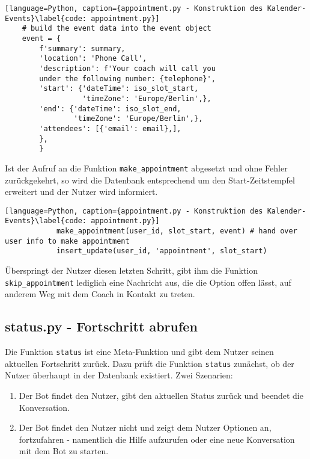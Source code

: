            \begin{lstlisting}[language=Python, caption={appointment.py - Konstruktion des Kalender-Events}\label{code: appointment.py}]
    # build the event data into the event object
    event = {
        f'summary': summary,
        'location': 'Phone Call',
        'description': f'Your coach will call you 
        under the following number: {telephone}',
        'start': {'dateTime': iso_slot_start,
                  'timeZone': 'Europe/Berlin',},
        'end': {'dateTime': iso_slot_end,
                'timeZone': 'Europe/Berlin',},
        'attendees': [{'email': email},],
        },
        }
            \end{lstlisting}
            
            Ist der Aufruf an die Funktion \verb|make_appointment| abgesetzt und ohne Fehler zurückgekehrt, so wird die Datenbank entsprechend um den Start-Zeitstempfel erweitert und der Nutzer wird informiert. 
            \begin{lstlisting}[language=Python, caption={appointment.py - Konstruktion des Kalender-Events}\label{code: appointment.py}]
            make_appointment(user_id, slot_start, event) # hand over user info to make appointment
            insert_update(user_id, 'appointment', slot_start)
            \end{lstlisting}

            Überspringt der Nutzer diesen letzten Schritt, gibt ihm die Funktion \verb|skip_appointment| lediglich eine Nachricht aus, die die Option offen lässt, auf anderem Weg mit dem Coach in Kontakt zu treten.

        \subsection{status.py - Fortschritt abrufen} \label{Implementierung: status.py}
            Die Funktion \verb|status| ist eine Meta-Funktion und gibt dem Nutzer seinen aktuellen Fortschritt zurück. Dazu prüft die Funktion \verb|status| zunächst, ob der Nutzer überhaupt in der Datenbank existiert. Zwei Szenarien: 
            \begin{enumerate}
                \item Der Bot findet den Nutzer, gibt den aktuellen Status zurück und beendet die Konversation.
                \item Der Bot findet den Nutzer nicht und zeigt dem Nutzer Optionen an, fortzufahren - namentlich die Hilfe aufzurufen oder eine neue Konversation mit dem Bot zu starten.
            \end{enumerate}







